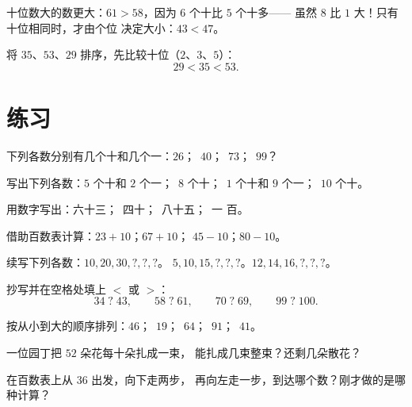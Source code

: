 \begin{method}[用十位比较]\label{met:g1:tens:compare}
十位数大的数更大：$61 > 58$，因为 $6$ 个十比 $5$ 个十多——
虽然 $8$ 比 $1$ 大！只有十位相同时，才由个位
决定大小：$43 < 47$。
\end{method}

\begin{example}\label{ex:g1:tens:compare}
将 $35$、$53$、$29$ 排序，先比较十位（$2$、$3$、$5$）：
\[
29 < 35 < 53 .
\]
\end{example}

\section{练习}

\begin{exercise}[$\star$]\label{exo:g1:tens:1}
下列各数分别有几个十和几个一：$26$；\ $40$；\ $73$；\ $99$？
\end{exercise}

\begin{exercise}[$\star$]\label{exo:g1:tens:2}
写出下列各数：$5$ 个十和 $2$ 个一；\ $8$ 个十；\ $1$ 个十和
$9$ 个一；\ $10$ 个十。
\end{exercise}

\begin{exercise}[$\star$]\label{exo:g1:tens:3}
用数字写出：六十三；\ 四十；\ 八十五；\ 一
百。
\end{exercise}

\begin{exercise}[$\star$]\label{exo:g1:tens:4}
借助百数表计算：$23 + 10$；\quad $67 + 10$；
\quad $45 - 10$；\quad $80 - 10$。
\end{exercise}

\begin{exercise}[$\star$]\label{exo:g1:tens:5}
续写下列各数：$10, 20, 30, ?, ?, ?$。\quad
$5, 10, 15, ?, ?, ?$。\quad $12, 14, 16, ?, ?, ?$。
\end{exercise}

\begin{exercise}[$\star$]\label{exo:g1:tens:6}
抄写并在空格处填上 $<$ 或 $>$：
\[
34 \;?\; 43, \qquad
58 \;?\; 61, \qquad
70 \;?\; 69, \qquad
99 \;?\; 100 .
\]
\end{exercise}

\begin{exercise}[$\star$]\label{exo:g1:tens:7}
按从小到大的顺序排列：$46$；\ $19$；\ $64$；\ $91$；\
$41$。
\end{exercise}

\begin{exercise}[$\star$]\label{exo:g1:tens:8}
一位园丁把 $52$ 朵花每十朵扎成一束，
能扎成几束整束？还剩几朵散花？
\end{exercise}

\begin{exercise}[$\star\star$]\label{exo:g1:tens:9}
在百数表上从 $36$ 出发，向下走两步，
再向左走一步，到达哪个数？刚才做的是哪种计算？
\end{exercise}

